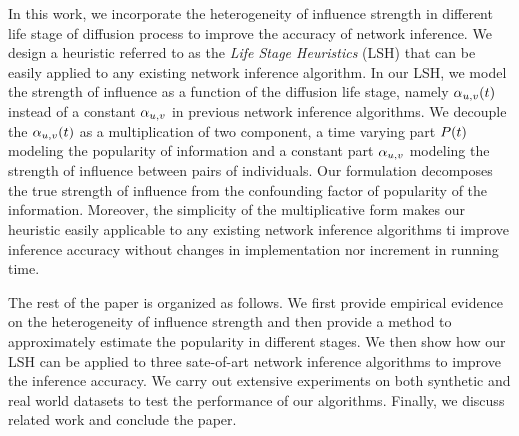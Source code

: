In this work, we incorporate the heterogeneity of influence strength in different life stage of diffusion process to improve the accuracy of network inference. We design a heuristic referred to as the \emph{Life Stage Heuristics} (LSH) that can be easily applied to any existing network inference algorithm. In our LSH, we model the strength of influence as a function of the diffusion life stage, namely $\alpha_{u,v}(t)$ instead of a constant $\alpha_{u,v}$ in previous network inference algorithms. We decouple the $\alpha_{u,v}(t)$ as a multiplication of two component, a time varying part $P(t)$ modeling the popularity of information and a constant part $\alpha_{u,v}$ modeling the strength of influence between pairs of individuals. Our formulation decomposes the true strength of influence from the confounding factor of popularity of the information. Moreover, the simplicity of the multiplicative form makes our heuristic easily applicable to any existing network inference algorithms ti improve inference accuracy without changes in implementation nor increment in running time.   


The rest of the paper is organized as follows. We first provide empirical evidence on the heterogeneity of influence strength and then provide a method to approximately estimate the popularity in different stages. We then show how our LSH can be applied to three sate-of-art network inference algorithms to improve the inference accuracy. We carry out extensive experiments on both synthetic and real world datasets to test the performance of our algorithms. Finally, we discuss related work and conclude the paper.  
